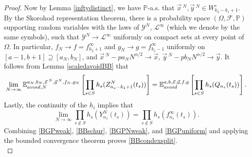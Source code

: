 \begin{proof}
	Now by Lemma \ref{inftydistinct}, we have $\mathbb{P}$-a.s. that $\vec{x}\,^N,\vec{y}\,^N\in W_{k_2-k_1+1}^\circ$. By the Skorohod representation theorem, there is a probability space $(\Omega,\mathcal{F},\mathbb{P})$ supporting random variables with the laws of $\mathcal{Y}^N$, $\mathcal{L}^\infty$ (which we denote by the same symbols), such that $\mathcal{Y}^N \to \mathcal{L}^\infty$ uniformly on compact sets at every point of $\Omega$. In particular, $f_N\to f = f^\infty_{k_2+1}$ and $g_N\to g = f^\infty_{k_1-1}$ uniformly on $[a-1,b+1]\supseteq [a_N,b_N]$, and $\vec{x}\,^N - pa_N N^{\alpha/2}\to\vec{x}$, $\vec{y}\,^N-pb_N N^{\alpha/2}\to\vec{y}$. It follows from Lemma \ref{scaledavoidBB} that 
	\begin{equation}\label{BGPNweak}
	\lim_{N\to\infty} \mathbb{E}^{a_N,b_N,\vec{x}\,^N,\vec{y}\,^N,f_N,g_N}_{avoid,N}\left[\prod_{s\in S} h_s(Z^N_{n_s-k_1+1}(t_s))\right] = \mathbb{E}^{a,b,\vec{x},\vec{y},f,g}_{avoid}\left[\prod_{s\in S} h_s(Q_{n_s}(t_s))\right].
	\end{equation}
	Lastly, the continuity of the $h_i$ implies that
	\begin{equation}\label{BGPuniform}
	\lim_{N\to\infty}\prod_{s\notin S} h_s(Y_{n_s}^N(t_s)) = \prod_{s\notin S} h_s(f^\infty_{n_s}(t_s)).
	\end{equation}
	Combining \eqref{BGPweak}, \eqref{BBschur}, \eqref{BGPNweak}, and \eqref{BGPuniform} and applying the bounded convergence theorem proves \eqref{BBcondexsplit}.\\
	

\end{proof}
